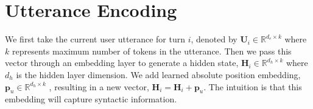 


\section{Utterance Encoding}

We first take the current user utterance for turn $i$, denoted by $\mathbf{U}_i\in \mathbb{R}^{d_e\times k}$ where $k$ represents maximum number of tokens in the utterance.
Then we pass this vector through an embedding layer to generate a hidden state, $\mathbf{H}_i \in\mathbb{R}^{d_h\times k}$ where $d_h$ is the hidden layer dimension. We add learned absolute position embedding, $\mathbf{p}_u \in \mathbb{R}^{d_h\times k}$ \cite{gehring2017convolutional}, resulting in a  new vector, $\mathbf{H}_i = \mathbf{H}_i + \mathbf{p}_u$. The intuition is that this embedding will capture syntactic information.

